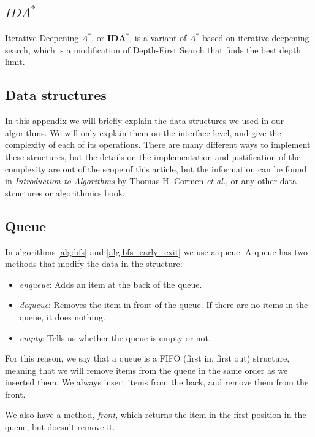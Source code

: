 \documentclass[12pt]{report}
\begin{document}
\section{$IDA^*$}
Iterative Deepening $A^*$, or $\bm{IDA^*}$, is a variant of $A^*$ based on iterative deepening search, which is a modification of Depth-First Search that finds the best depth limit. %




\begin{appendices}

\chapter{Data structures}

In this appendix we will briefly explain the data structures we used in our algorithms. We will only explain them on the interface level, and give the complexity of each of its operations. There are many different ways to implement these structures, but the details on the implementation and justification of the complexity are out of the scope of this article, but the information can be found in \emph{Introduction to Algorithms} by Thomas H. Cormen \textit{et al.}, or any other data structures or algorithmics book.

\section{Queue}
\label{annex:queue}
In algorithms \ref{alg:bfs} and \ref{alg:bfs_early_exit} we use a queue. A queue has two methods that modify the data in the structure:
\begin{itemize}
\item \emph{enqueue}: Adds an item at the back of the queue.
\item \emph{dequeue}: Removes the item in front of the queue. If there are no items in the queue, it does nothing.
\item \emph{empty}: Tells us whether the queue is empty or not.
\end{itemize}
For this reason, we say that a queue is a FIFO (first in, first out) structure, meaning that we will remove items from the queue in the same order as we inserted them. We always insert items from the back, and remove them from the front.

We also have a method, \emph{front}, which returns the item in the first position in the queue, but doesn't remove it.


\end{appendices}
\end{document}
